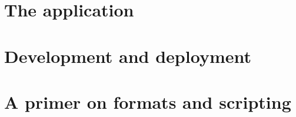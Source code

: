 \documentclass[a4paper,oneside,12pt]{memoir}
\begin{document}
\tableofcontents*

\cleardoublepage

\mainmatter



\part{The application}
\label{part:application}








\part{Development and deployment}
\label{part:developmentanddeployment}




\part{A primer on formats and scripting}
\label{part:primer}



\end{document}
